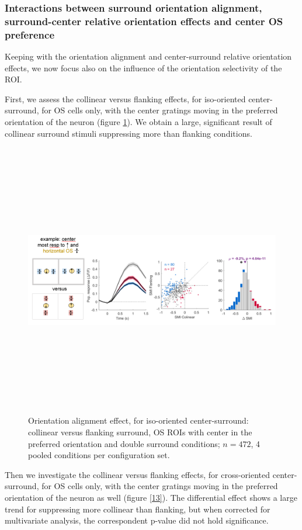 \subsubsection{Interactions between surround orientation alignment, surround-center relative orientation effects and center OS preference}

Keeping with the orientation alignment and center-surround relative orientation effects, we now focus also on the influence of the orientation selectivity of the ROI.

First, we assess the collinear versus flanking effects, for iso-oriented center-surround, for OS cells only, with the center gratings moving in the preferred orientation of the neuron (figure \ref{12}). We obtain a large, significant result of collinear surround stimuli suppressing more than flanking conditions.

\begin{figure}[H] \centering \includegraphics[width=12cm,height=12cm,keepaspectratio]{Figures/7.Results/finalPopulation/sel/diagrams/12.png} 
\caption{Orientation alignment effect, for iso-oriented center-surround: collinear versus flanking surround, OS ROIs with center in the preferred orientation and double surround conditions;  $n=472$, 4 pooled conditions per configuration set.} \label{12} 
\end{figure}

Then we investigate the collinear versus flanking effects, for cross-oriented center-surround, for OS cells only, with the center gratings moving in the preferred orientation of the neuron as well (figure \ref{13}). The differential effect shows a large trend for suppressing more collinear than flanking, but when corrected for multivariate analysis, the correspondent p-value did not hold significance.

